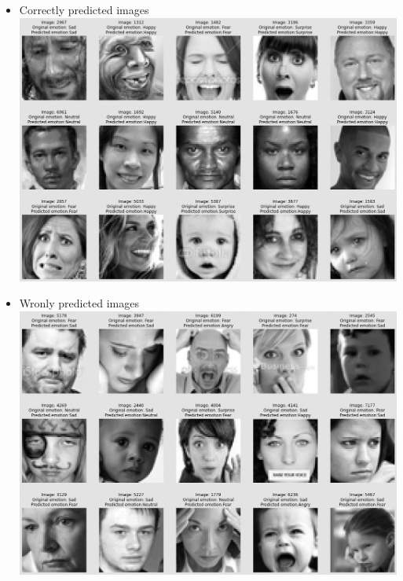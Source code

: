 \begin{itemize}
    \item Correctly predicted images\\
            \includegraphics[scale=0.50]{images/modelTwo/trueTwo.png}
    \item Wronly predicted images\\
            \includegraphics[scale=0.50]{images/modelTwo/falseTwo.png}
\end{itemize}
